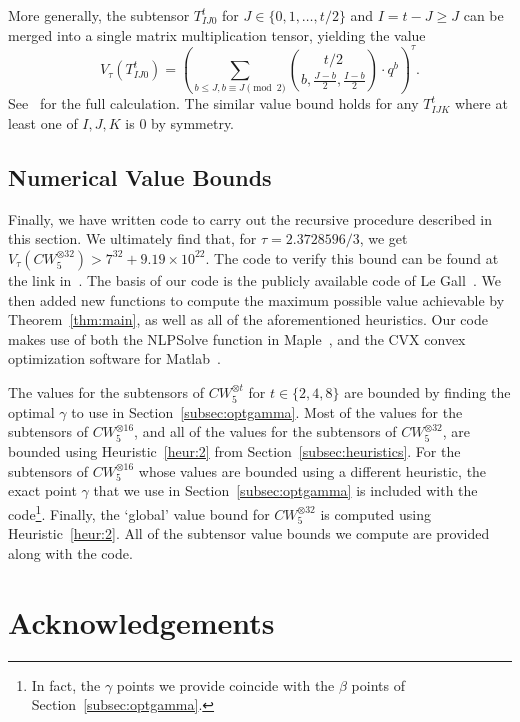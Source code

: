 \PassOptionsToPackage{shortlabels}{enumitem}\documentclass[10pt,a4paper]{article}
\begin{document}
More generally, the subtensor $T^t_{IJ0}$ for $J \in \{0,1,\ldots,t/2\}$ and $I = t-J \geq J$ can be merged into a single matrix multiplication tensor, yielding the value $$V_\tau(T^t_{IJ0}) = \left( \sum_{b \leq J, b \equiv J\pmod{2}} \binom{t/2}{b,\frac{J-b}{2},\frac{I-b}{2}} \cdot q^b  \right)^\tau.$$
 See~\cite[{Claim~1}]{v12} for the full calculation. The similar value bound holds for any $T^t_{IJK}$ where at least one of $I,J,K$ is $0$ by symmetry.

\subsection{Numerical Value Bounds}

Finally, we have written code to carry out the recursive procedure described in this section. We ultimately find that, for $\tau = 2.3728596 / 3$, we get $V_\tau(CW_5^{\otimes 32}) > 7^{32} + 9.19 \times 10^{22}$. The code to verify this bound can be found at the link in~\cite{vercode}.
The basis of our code is the publicly available code of Le Gall~\cite{legall}. We then added new functions to compute the maximum possible value achievable by Theorem~\ref{thm:main}, as well as all of the aforementioned heuristics. Our code makes use of both the NLPSolve function in Maple~\cite{maple}, and the CVX convex optimization software for Matlab~\cite{cvx,gb08,MATLAB2019}.

The values for the subtensors of $CW_5^{\otimes t}$ for $t \in \{2,4,8\}$ are bounded by finding the optimal $\gamma$ to use in Section~\ref{subsec:optgamma}. Most of the values for the subtensors of $CW_5^{\otimes 16}$, and all of the values for the subtensors of $CW_5^{\otimes 32}$, are bounded using Heuristic~\ref{heur:2} from Section~\ref{subsec:heuristics}. For the subtensors of $CW_5^{\otimes 16}$ whose values are bounded using a different heuristic, the exact point $\gamma$ that we use in Section~\ref{subsec:optgamma} is included with the code\footnote{In fact, the $\gamma$ points we provide coincide with the $\beta$ points of Section~\ref{subsec:optgamma}.}. Finally, the `global' value bound for $CW_5^{\otimes 32}$ is computed using Heuristic~\ref{heur:2}. All of the subtensor value bounds we compute are provided along with the code.
 
\section*{Acknowledgements}
\end{document}
